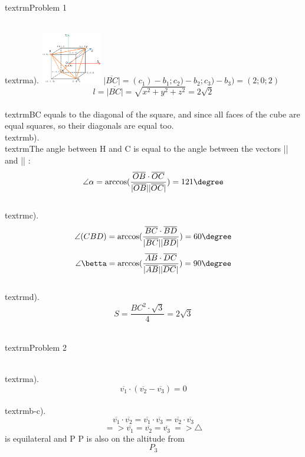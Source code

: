 
\usepackage{amsmath}
\usepackage[dvipdfm]{graphicx}
\usepackage{mathtools}

\graphicspath{{pictures/}}



    \begin{center}
        \\textrm{Problem 1}
    \end{center}
    \\textrm{a).}
    \includegraphics[width=100px]{cube}
    \(\overline{|BC|}=(c_{1})-b_{1};c_{2})-b_{2};c_{3})-b_{3})=(2;0;2)\)
    \[l=\overline{|BC|}=\sqrt{x^2 + y^2 + z^2}=2\sqrt{2}\]
    \\textrm{BC equals to the diagonal of the square, and since all faces of the cube are equal squares, so their diagonals are equal too.}
    \\textrm{b).}
    \\textrm{The angle between H and C is equal to the angle between the vectors || and || :}
    \[\angle \alpha = \arccos(\frac {\overline{OB}\cdot \overline{OC}}{|\overline{OB}| |\overline{OC}|}) = 121 \degree\]
    \\textrm{c).}
    \[\angle (CBD) = \arccos(\frac {\overline{BC}\cdot \overline{BD}}{|\overline{BC}| |\overline{BD}|}) = 60 \degree\]
    \[\angle \betta = \arccos(\frac {\overline{AB}\cdot \overline{DC}}{|\overline{AB}| |\overline{DC}|}) = 90 \degree \]
    \\textrm{d).}
    \[S = \frac{BC^2\cdot\sqrt{3}}{4} = 2\sqrt{3}\]

    \begin{center}
        \\textrm{Problem 2}
    \end{center}
    \\textrm{a).}
    \[\overline{v_1}\cdot(\overline{v_2}-\overline{v_3})=0\]
    \\textrm{b-c).}
    \[\overline{v_1}\cdot\overline{v_2}=\overline{v_1}\cdot\overline{v_3}=\overline{v_2}\cdot\overline{v_3}\]
    \[=> \overline{v_1}=\overline{v_2}=\overline{v_3}\ => \triangle\] \textrm{ is equilateral and } P \textrm{P is also on the altitude from } \[P_3\]

